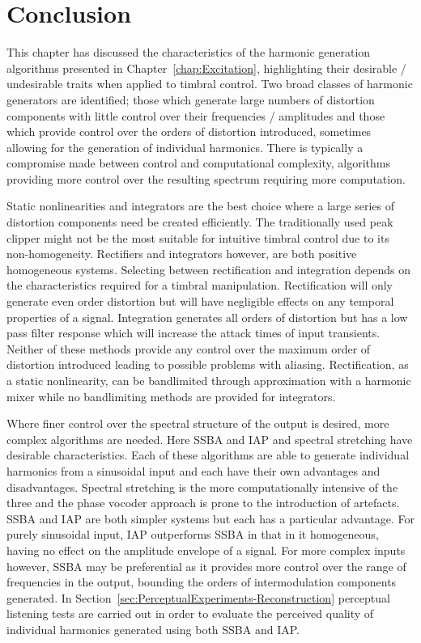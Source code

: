 \section{Conclusion}
	This chapter has discussed the characteristics of the harmonic generation algorithms presented in
	Chapter~\ref{chap:Excitation}, highlighting their desirable / undesirable traits when applied to timbral control.
	Two broad classes of harmonic generators are identified; those which generate large numbers of distortion
	components with little control over their frequencies / amplitudes and those which provide control over the orders
	of distortion introduced, sometimes allowing for the generation of individual harmonics. There is typically a
	compromise made between control and computational complexity, algorithms providing more control over the resulting
	spectrum requiring more computation.

	Static nonlinearities and integrators are the best choice where a large series of distortion components need be
	created efficiently. The traditionally used peak clipper might not be the most suitable for intuitive timbral
	control due to its non-homogeneity. Rectifiers and integrators however, are both positive homogeneous systems.
	Selecting between rectification and integration depends on the characteristics required for a timbral manipulation.
	Rectification will only generate even order distortion but will have negligible effects on any temporal properties
	of a signal. Integration generates all orders of distortion but has a low pass filter response which will increase
	the attack times of input transients. Neither of these methods provide any control over the maximum order of
	distortion introduced leading to possible problems with aliasing. Rectification, as a static nonlinearity, can be
	bandlimited through approximation with a harmonic mixer while no bandlimiting methods are provided for integrators.

	Where finer control over the spectral structure of the output is desired, more complex algorithms are needed. Here
	SSBA and IAP and spectral stretching have desirable characteristics. Each of these algorithms are able to generate
	individual harmonics from a sinusoidal input and each have their own advantages and disadvantages. Spectral
	stretching is the more computationally intensive of the three and the phase vocoder approach is prone to the
	introduction of artefacts. SSBA and IAP are both simpler systems but each has a particular advantage. For purely
	sinusoidal input, IAP outperforms SSBA in that in it homogeneous, having no effect on the amplitude envelope of a
	signal. For more complex inputs however, SSBA may be preferential as it provides more control over the range of
	frequencies in the output, bounding the orders of intermodulation components generated.	In
	Section~\ref{sec:PerceptualExperiments-Reconstruction} perceptual listening tests are carried out in order to
	evaluate the perceived quality of individual harmonics generated using both SSBA and IAP.

